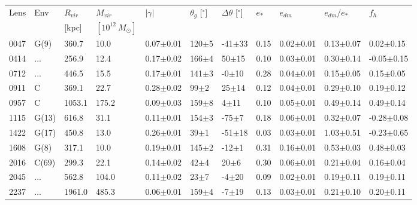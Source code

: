 \documentclass[useAMS,usenatbib]{mn2e}
\begin{document}
\begin{table}
\begin{center}
\begin{tabular}{l l l l l l l l l l l}
      \multirow{2}{*}{Lens} & \multirow{2}{*}{Env} & $R_{vir}$ & $M_{vir}$ & \multirow{2}{*}{$|\gamma|$} & \multirow{2}{*}{$\theta_{g}$ [$^{\circ}$]} & \multirow{2}{*}{$\Delta\theta$ [$^{\circ}$]} & \multirow{2}{*}{$e_{*}$} & \multirow{2}{*}{$e_{dm}$} & \multirow{2}{*}{$e_{dm}/e_{*}$} & \multirow{2}{*}{$f_h$} \\
       & & [kpc] & $[10^{12} \ M_{\odot}]$ & & & & & & & \\ \hline
      0047 & G(9) & 360.7 & 10.0 & 0.07$\pm$0.01 & 120$\pm$5 & -41$\pm$33 & 0.15 & 0.02$\pm$0.01 & 0.13$\pm$0.07 & 0.02$\pm$0.15 \\
      0414 & ... & 256.9 & 12.4 & 0.17$\pm$0.02 & 166$\pm$4 & 50$\pm$15 & 0.10 & 0.03$\pm$0.01 & 0.30$\pm$0.14 & -0.05$\pm$0.15 \\
      0712 & ... & 446.5 & 15.5 & 0.17$\pm$0.01 & 141$\pm$3 & -0$\pm$10 & 0.28 & 0.04$\pm$0.01 & 0.15$\pm$0.05 & 0.15$\pm$0.05 \\
      0911 & C & 369.1 & 22.7 & 0.28$\pm$0.02 & 99$\pm$2 & 25$\pm$14 & 0.12 & 0.04$\pm$0.01 & 0.29$\pm$0.10 & 0.19$\pm$0.12 \\
      0957 & C & 1053.1 & 175.2 & 0.09$\pm$0.03 & 159$\pm$8 & 4$\pm$11 & 0.10 & 0.05$\pm$0.01 & 0.49$\pm$0.14 & 0.49$\pm$0.14 \\
      1115 & G(13) & 616.8 & 31.1 & 0.11$\pm$0.01 & 154$\pm$3 & -75$\pm$7 & 0.18 & 0.06$\pm$0.01 & 0.32$\pm$0.07 & -0.28$\pm$0.08 \\
      1422 & G(17) & 450.8 & 13.0 & 0.26$\pm$0.01 & 39$\pm$1 & -51$\pm$18 & 0.03 & 0.03$\pm$0.01 & 1.03$\pm$0.51 & -0.23$\pm$0.65 \\
      1608 & G(8) & 317.1 & 10.0 & 0.19$\pm$0.01 & 145$\pm$2 & -12$\pm$1 & 0.31 & 0.16$\pm$0.01 & 0.53$\pm$0.03 & 0.48$\pm$0.03 \\
      2016 & C(69) & 299.3 & 22.1 & 0.14$\pm$0.02 & 42$\pm$4 & 20$\pm$6 & 0.30 & 0.06$\pm$0.01 & 0.21$\pm$0.04 & 0.16$\pm$0.04 \\
      2045 & ... & 562.8 & 104.0 & 0.11$\pm$0.02 & 23$\pm$7 & -4$\pm$20 & 0.09 & 0.02$\pm$0.01 & 0.19$\pm$0.11 & 0.19$\pm$0.11 \\
      2237 & ... & 1961.0 & 485.3 & 0.06$\pm$0.01 & 159$\pm$4 & -7$\pm$19 & 0.13 & 0.03$\pm$0.01 & 0.21$\pm$0.10 & 0.20$\pm$0.11 \\
    \end{tabular}

\end{center}
\end{table}
\end{document}
